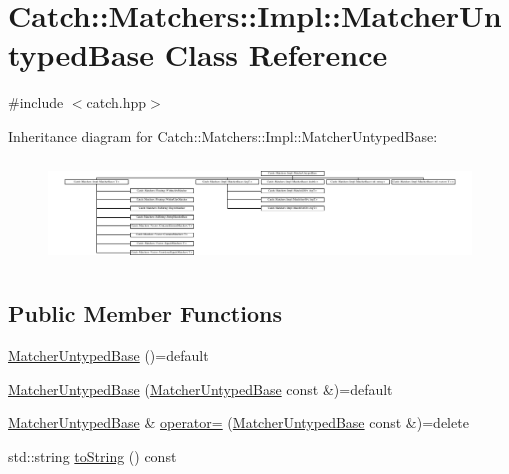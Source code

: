 \hypertarget{class_catch_1_1_matchers_1_1_impl_1_1_matcher_untyped_base}{}\section{Catch\+:\+:Matchers\+:\+:Impl\+:\+:Matcher\+Untyped\+Base Class Reference}
\label{class_catch_1_1_matchers_1_1_impl_1_1_matcher_untyped_base}


{\ttfamily \#include $<$catch.\+hpp$>$}

Inheritance diagram for Catch\+:\+:Matchers\+:\+:Impl\+:\+:Matcher\+Untyped\+Base\+:\begin{figure}[H]
\begin{center}
\leavevmode
\includegraphics[height=2.769535cm]{class_catch_1_1_matchers_1_1_impl_1_1_matcher_untyped_base}
\end{center}
\end{figure}
\subsection*{Public Member Functions}
\begin{DoxyCompactItemize}
\item 
\mbox{\hyperlink{class_catch_1_1_matchers_1_1_impl_1_1_matcher_untyped_base_ab65764dc245d85e2b268d3be870b650a}{Matcher\+Untyped\+Base}} ()=default
\item 
\mbox{\hyperlink{class_catch_1_1_matchers_1_1_impl_1_1_matcher_untyped_base_a985fd3c3ffcc9f2e8dc7a330130040b0}{Matcher\+Untyped\+Base}} (\mbox{\hyperlink{class_catch_1_1_matchers_1_1_impl_1_1_matcher_untyped_base}{Matcher\+Untyped\+Base}} const \&)=default
\item 
\mbox{\hyperlink{class_catch_1_1_matchers_1_1_impl_1_1_matcher_untyped_base}{Matcher\+Untyped\+Base}} \& \mbox{\hyperlink{class_catch_1_1_matchers_1_1_impl_1_1_matcher_untyped_base_a62668ccc47b64a9094dcb6413f9af80b}{operator=}} (\mbox{\hyperlink{class_catch_1_1_matchers_1_1_impl_1_1_matcher_untyped_base}{Matcher\+Untyped\+Base}} const \&)=delete
\item 
std\+::string \mbox{\hyperlink{class_catch_1_1_matchers_1_1_impl_1_1_matcher_untyped_base_a5982c7c80ca71dfe2298babadad7a453}{to\+String}} () const
\end{DoxyCompactItemize}
